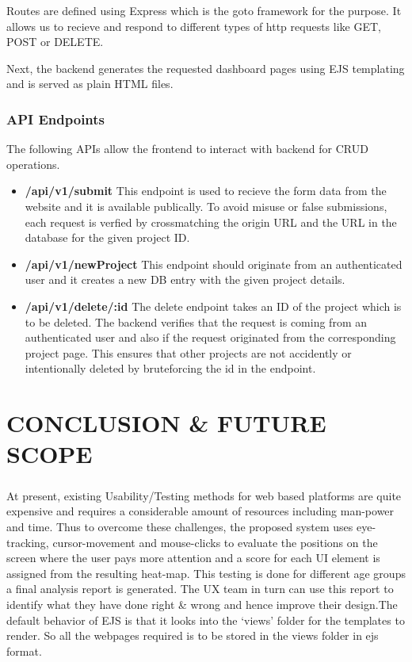 \documentclass[12pt,a4paper,final]{extreport}
\begin{document}
Routes are defined using Express which is the goto framework for the purpose. It allows us to recieve and respond to different types of http requests like GET, POST or DELETE. 

Next, the backend generates the requested dashboard pages using EJS templating and is served as plain HTML files.

\subsection{API Endpoints}
The following APIs allow the frontend to interact with backend for CRUD operations.
\begin{itemize}
    \item \textbf{/api/v1/submit} This endpoint is used to recieve the form data from the website and it is available publically. To avoid misuse or false submissions, each request is verfied by crossmatching the origin URL and the URL in the database for the given project ID.
    \item \textbf{/api/v1/newProject} This endpoint should originate from an authenticated user and it creates a new DB entry with the given project details.
    \item \textbf{/api/v1/delete/:id} The delete endpoint takes an ID of the project which is to be deleted. The backend verifies that the request is coming from an authenticated user and also if the request originated from the corresponding project page. This ensures that other projects are not accidently or intentionally deleted by bruteforcing the id in the endpoint.
\end{itemize}

\newpage
\chapter{CONCLUSION \& FUTURE SCOPE}
\paragraph{}
At present, existing Usability/\-Testing methods for web based platforms are quite expensive and requires a considerable amount of resources including man-power and time.
Thus to overcome these challenges, the proposed system uses eye-tracking, cursor-movement and mouse-clicks to evaluate the positions on the screen where the user pays more attention and a score for each UI element is assigned from the resulting heat-map.
This testing is done for different age groups a final analysis report is generated. The UX team in turn can use this report to identify what they have done right \& wrong and hence improve their design.The default behavior of EJS is that it looks into the ‘views’ folder for the templates to render. So all the webpages required is to be stored in the views folder in ejs format.
\end{document}
